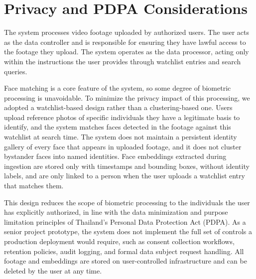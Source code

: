 \section{Privacy and PDPA Considerations}
\label{section:privacy-pdpa}

The system processes video footage uploaded by authorized users. The user acts as the data controller and is responsible for ensuring they have lawful access to the footage they upload. The system operates as the data processor, acting only within the instructions the user provides through watchlist entries and search queries.

Face matching is a core feature of the system, so some degree of biometric processing is unavoidable. To minimize the privacy impact of this processing, we adopted a watchlist-based design rather than a clustering-based one. Users upload reference photos of specific individuals they have a legitimate basis to identify, and the system matches faces detected in the footage against this watchlist at search time. The system does not maintain a persistent identity gallery of every face that appears in uploaded footage, and it does not cluster bystander faces into named identities. Face embeddings extracted during ingestion are stored only with timestamps and bounding boxes, without identity labels, and are only linked to a person when the user uploads a watchlist entry that matches them.

This design reduces the scope of biometric processing to the individuals the user has explicitly authorized, in line with the data minimization and purpose limitation principles of Thailand's Personal Data Protection Act (PDPA). As a senior project prototype, the system does not implement the full set of controls a production deployment would require, such as consent collection workflows, retention policies, audit logging, and formal data subject request handling. All footage and embeddings are stored on user-controlled infrastructure and can be deleted by the user at any time.
